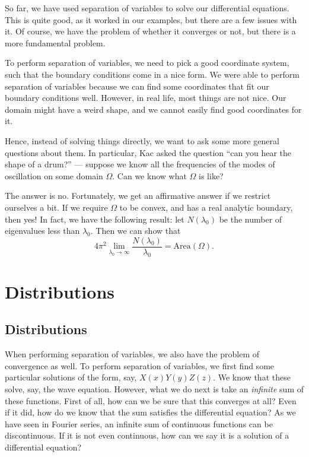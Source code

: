 \documentclass[a4paper]{article}
\begin{document}
So far, we have used separation of variables to solve our differential equations. This is quite good, as it worked in our examples, but there are a few issues with it. Of course, we have the problem of whether it converges or not, but there is a more fundamental problem.

To perform separation of variables, we need to pick a good coordinate system, such that the boundary conditions come in a nice form. We were able to perform separation of variables because we can find some coordinates that fit our boundary conditions well. However, in real life, most things are not nice. Our domain might have a weird shape, and we cannot easily find good coordinates for it.

Hence, instead of solving things directly, we want to ask some more general questions about them. In particular, Kac asked the question ``can you hear the shape of a drum?'' --- suppose we know all the frequencies of the modes of oscillation on some domain $\Omega$. Can we know what $\Omega$ is like?

The answer is no. Fortunately, we get an affirmative answer if we restrict ourselves a bit. If we require $\Omega$ to be convex, and has a real analytic boundary, then yes! In fact, we have the following result: let $N(\lambda_0)$ be the number of eigenvalues less than $\lambda_0$. Then we can show that
\[
  4\pi^2 \lim_{\lambda_0 \to \infty} \frac{N(\lambda_0)}{\lambda_0} = \mathrm{Area}(\Omega).
\]

\section{Distributions}
\subsection{Distributions}
When performing separation of variables, we also have the problem of convergence as well. To perform separation of variables, we first find some particular solutions of the form, say, $X(x)Y(y)Z(z)$. We know that these solve, say, the wave equation. However, what we do next is take an \emph{infinite} sum of these functions. First of all, how can we be sure that this converges at all? Even if it did, how do we know that the sum satisfies the differential equation? As we have seen in Fourier series, an infinite sum of continuous functions can be discontinuous. If it is not even continuous, how can we say it is a solution of a differential equation?
\end{document}
